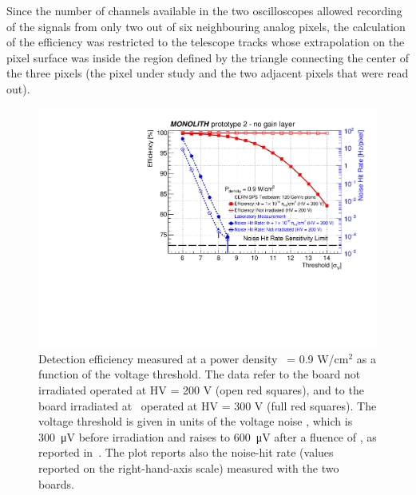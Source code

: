 		Since the number of channels available in the two oscilloscopes allowed recording of the signals from only two out of six neighbouring analog pixels, the calculation of the efficiency was restricted to the telescope tracks whose extrapolation on the pixel surface was inside the region defined by the triangle connecting the center of the three pixels (the pixel under study and the two adjacent pixels that were read out).
		\begin{figure}[h]
			\centering
			\includegraphics[width=.85\textwidth]{files/MONOLITH_Irradiated_paper/M06_M16}
			\caption{Detection efficiency measured at a power density \power~= 0.9 W/cm$^2$ as a function of the voltage threshold. The data refer to the board not irradiated operated at HV = 200 V (open red squares), and to the board irradiated at \maxflu~operated at HV = 300 V (full red squares). The voltage threshold is given in units of the voltage noise \noise, which is \SI{300}{\micro\volt} before irradiation and raises to \SI{600}{\micro\volt} after a fluence of \maxflu, as reported in~\cite{LabRad_Mono2023}. The plot reports also the noise-hit rate (values reported on the right-hand-axis scale) measured with the two boards.}
			\label{im:MONO-IR_HV_vs_th} 
		\end{figure}
		
